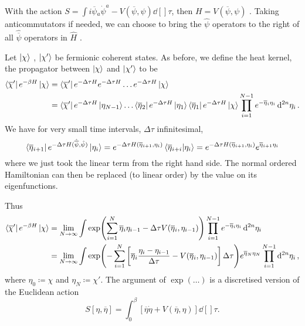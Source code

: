 With the action $S = \int i \overline{\psi}{}_a \dot{\psi}^a - V(\overline{\psi}{}, \psi) \dd[]{\tau}$, then $H = V(\overline{\psi}{}, \psi)$ . 
Taking anticommutators if needed, we can choose to bring the $\hat{\psi}$  operators to the right of all $\hat{\overline{\psi}{}}$  operators in $\hat{H}$ .

Let $\ket{\chi}$ , $\ket{\chi'}$  be fermionic coherent states. As before, we define the heat kernel, the propagator between $\ket{\chi}$  and $\ket{\chi'}$  to be 
\begin{align}
  \bra{\overline{\chi}{}'} e^{-\beta H} \ket{\chi} &= \bra{\overline{\chi}{}'} e^{- \Delta \tau H} e^{- \Delta \tau H} \dots e^{- \Delta \tau H} \ket{\chi} \\
  &= \bra{\overline{\chi}{}'} e^{-\Delta \tau H} \ket{\eta_{N-1}} \dots \bra{\overline{\eta}{}_2} e^{-\Delta \tau H} \ket{\eta_1} \bra{\overline{\eta}{}_1} e^{- \Delta \tau H} \ket{\chi} \prod_{i = 1}^{N-1} e^{- \overline{\eta}{}_i \eta_i} \dd[2n]{\eta_i}.
\end{align}
We have for very small time intervals, $\Delta \tau$ infinitesimal, 
\begin{equation}
  \bra{\overline{\eta}{}_{i+1}} e^{- \Delta \tau H (\hat{\overline{\psi}{}}, \hat{\psi})} \ket{\eta_{i}} = e^{-\Delta \tau H(\overline{\eta}{}_{i + 1}, \eta_i)} \bra{\overline{\eta}{}_{i + i}} \ket{\eta_i} = e^{-\Delta \tau H(\overline{\eta}{}_{i+1}, \eta_i)} e^{\overline{\eta}{}_{i + 1} \eta_i}
\end{equation}
where we just took the linear term from the right hand side. The normal ordered Hamiltonian can then be replaced (to linear order) by the value on its eigenfunctions.

Thus 
\begin{align}
  \bra{\overline{\chi}{}'} e^{- \beta H} \ket{\chi} &= \lim_{N \to \infty} \int \exp(\sum_{i=1}^{N} \overline{\eta}{}_i \eta_{i-1} - \Delta \tau V(\overline{\eta}{}_i, \eta_{i-1}))
  \prod_{i = 1}^{N-1} e^{- \overline{\eta}{}_i \eta_i} \dd[2n]{\eta_i} \\
				       &= \lim_{N \to \infty}  \int \exp(-\sum_{i=1}^{N} \left[ \overline{\eta}{}_i \frac{\eta_i - \eta_{i-1}}{\Delta \tau} - V(\overline{\eta}{}_i, \eta_{i-1}) \right]\Delta \tau) e^{\overline{\eta}{}_N \eta_N} \prod_{i = 1}^{N-1} \dd[2n]{\eta_i},
\end{align}
where $\eta_0 \coloneqq \chi$ and $\eta_N \coloneqq\chi'$. The argument of $\exp(\dots)$ is a discretised version of the Euclidean action
\begin{equation}
  S[\eta, \overline{\eta}{}] = \int_0^{\beta} \left[ \overline{\eta}{} \dot{\eta} + V(\overline{\eta}{}, \eta) \right] \dd[]{\tau}.
\end{equation}

